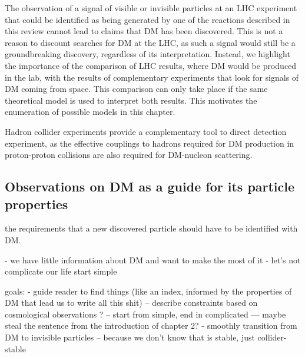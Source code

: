 \begin{textbox}[!h]
The observation of a signal of visible or invisible particles at an LHC experiment that could be identified as being generated by one of the reactions described in this review cannot lead to claims that DM has been discovered. This is not a reason to discount searches for DM at the LHC, as such a signal would still be a groundbreaking discovery, regardless of its interpretation. Instead, we highlight the importance of the comparison of LHC results, where DM would be produced in the lab, with the results of complementary experiments that look for signals of DM coming from space. This comparison can only take place if the same theoretical model is used to interpret both results. This motivates the enumeration of possible models in this chapter. 

Hadron collider experiments provide a complementary tool to direct detection experiment, as the effective couplings to hadrons required for DM production in proton-proton collisions are also required for DM-nucleon scattering. %




\end{textbox}








\subsection{Observations on DM as a guide for its particle properties}
\label{sec:DMObservations}









the requirements that a new discovered particle should have to be identified with DM. 


- we have little information about DM and want to make the most of it
- let's not complicate our life start simple





goals: 
- guide reader to find things (like an index, informed by the properties of DM that lead us to write all this shit)
-- describe constraints based on cosmological observations ?
-- start from simple, end in complicated 
--- maybe steal the sentence from the introduction of chapter 2?
- smoothly transition from DM to invisible particles
-- because we don't know that is stable, just collider-stable





